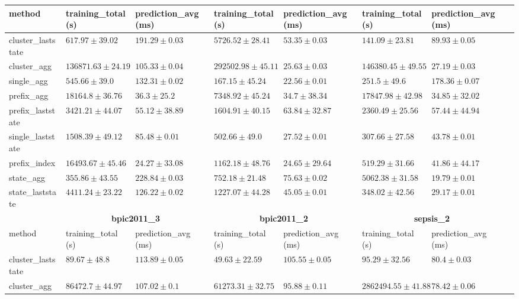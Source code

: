 \begin{table}[!htbp]
{\begin{tabular}{llllllll}
			method  & training\_total (s) & prediction\_avg (ms) & training\_total (s) & prediction\_avg (ms) & training\_total (s) & prediction\_avg (ms) \\ \midrule
			cluster\_laststate & $617.97 \pm 39.02$ & $191.29 \pm 0.03$ & $5726.52 \pm 28.41$ & $53.35 \pm 0.03$ & $\mathbf{141.09 \pm 23.81}$ & $89.93 \pm 0.05$ \\ 
			cluster\_agg & $136871.63 \pm 24.19$ & $105.33 \pm 0.04$ & $292502.98 \pm 45.11$ & $25.63 \pm 0.03$ & $146380.45 \pm 49.55$ & $27.19 \pm 0.03$ \\ 
			single\_agg & $545.66 \pm 39.0$ & $132.31 \pm 0.02$ & $\mathbf{167.15 \pm 45.24}$ & $\mathbf{22.56 \pm 0.01}$ & $251.5 \pm 49.6$ & $178.36 \pm 0.07$ \\ 
			prefix\_agg & $18164.8 \pm 36.76$ & $36.3 \pm 25.2$ & $7348.92 \pm 45.24$ & $34.7 \pm 38.34$ & $17847.98 \pm 42.98$ & $34.85 \pm 32.02$ \\ 
			prefix\_laststate & $3421.21 \pm 44.07$ & $55.12 \pm 38.89$ & $1604.91 \pm 40.15$ & $63.84 \pm 32.87$ & $2360.49 \pm 25.56$ & $57.44 \pm 44.94$ \\ 
			single\_laststate & $1508.39 \pm 49.12$ & $85.48 \pm 0.01$ & $502.66 \pm 49.0$ & $27.52 \pm 0.01$ & $307.66 \pm 27.58$ & $43.78 \pm 0.01$ \\ 
			prefix\_index & $16493.67 \pm 45.46$ & $\mathbf{24.27 \pm 33.08}$ & $1162.18 \pm 48.76$ & $24.65 \pm 29.64$ & $519.29 \pm 31.66$ & $41.86 \pm 44.17$ \\ 
			state\_agg & $\mathbf{355.86 \pm 43.55}$ & $228.84 \pm 0.03$ & $752.18 \pm 21.48$ & $75.63 \pm 0.02$ & $5062.38 \pm 31.58$ & $\mathbf{19.79 \pm 0.01}$ \\ 
			state\_laststate & $4411.24 \pm 23.22$ & $126.22 \pm 0.02$ & $1227.07 \pm 44.28$ & $45.05 \pm 0.01$ & $348.02 \pm 42.56$ & $29.17 \pm 0.01$ \\ 
			\bottomrule
			\toprule
			& \multicolumn{2}{c}{{\bfseries bpic2011\_3}} & \multicolumn{2}{c}{{\bfseries bpic2011\_2}} & \multicolumn{2}{c}{{\bfseries sepsis\_2}} \\ \cmidrule(lr){2-3} \cmidrule(lr){4-5} \cmidrule(lr){6-7}
			method  & training\_total (s) & prediction\_avg (ms) & training\_total (s) & prediction\_avg (ms) & training\_total (s) & prediction\_avg (ms) \\ \midrule
			cluster\_laststate & $\mathbf{89.67 \pm 48.8}$ & $113.89 \pm 0.05$ & $\mathbf{49.63 \pm 22.59}$ & $105.55 \pm 0.05$ & $95.29 \pm 32.56$ & $80.4 \pm 0.03$ \\ 
			cluster\_agg & $86472.7 \pm 44.97$ & $107.02 \pm 0.1$ & $61273.31 \pm 32.75$ & $95.88 \pm 0.11$ & $2862494.55 \pm 41.88$ & $78.42 \pm 0.06$ \\ 

\end{tabular}}
\end{table}
